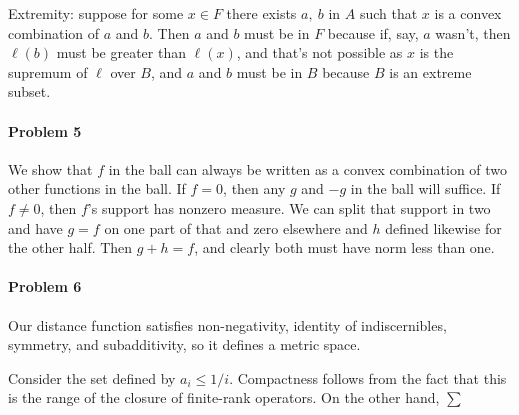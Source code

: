 \documentclass[12pt]{article}
\begin{document}
Extremity: suppose for some $x \in F$ there exists $a,\ b$ in $A$ such that
$x$ is a convex combination of $a$ and $b$. Then $a$ and $b$ must be in $F$
because if, say, $a$ wasn't, then $\ell(b)$ must be greater than $\ell(x)$,
and that's not possible as $x$ is the supremum of $\ell$ over $B$, and $a$ and
$b$ must be in $B$ because $B$ is an extreme subset.

\paragraph{Problem 5}
We show that $f$ in the ball can always be written as a convex combination of
two other functions in the ball. If $f = 0$, then any $g$ and $-g$ in the ball
will suffice. If $f \neq 0$, then $f$'s support has nonzero measure. We can
split that support in two and have $g = f$ on one part of that and zero elsewhere
and $h$ defined likewise for the other half. Then $g + h = f$, and clearly
both must have norm less than one.

\paragraph{Problem 6}
Our distance function satisfies non-negativity, identity of indiscernibles,
symmetry, and subadditivity, so it defines a metric space.

Consider the set defined by $a_i \leq 1/i$. Compactness
follows from the fact that this is the range of the closure of finite-rank
operators. On the other hand, $\sum$
\end{document}
